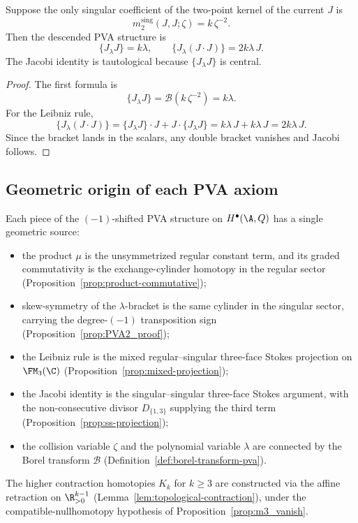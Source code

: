 \begin{proposition}
\label{prop:abelian-study}
Suppose the only singular coefficient of the two-point kernel of the current $J$ is
\[
m_2^{\mathrm{sing}}(J,J;\zeta)=k\,\zeta^{-2}.
\]
Then the descended PVA structure is
\[
\{J_\lambda J\}=k\lambda,
\qquad
\{J_\lambda (J\cdot J)\}=2k\lambda\,J.
\]
The Jacobi identity is tautological because $\{J_\lambda J\}$ is central.
\end{proposition}

\begin{proof}
The first formula is
\[
\{J_\lambda J\}
=
\mathcal B(k\,\zeta^{-2})
=
k\lambda.
\]
For the Leibniz rule,
\[
\{J_\lambda(J\cdot J)\}
=
\{J_\lambda J\}\cdot J + J\cdot\{J_\lambda J\}
=
k\lambda\,J + k\lambda\,J
=
2k\lambda\,J.
\]
Since the bracket lands in the scalars, any double bracket vanishes and Jacobi follows.
\end{proof}

\subsection{Geometric origin of each PVA axiom}

\begin{summary}
\label{sum:pva-foundational-repair}
Each piece of the $(-1)$-shifted PVA structure on $H^\bullet(\A,Q)$
has a single geometric source:
\begin{itemize}
\item the product $\mu$ is the unsymmetrized regular constant term, and
 its graded commutativity is the exchange-cylinder homotopy in the
 regular sector (Proposition~\ref{prop:product-commutative});
\item skew-symmetry of the $\lambda$-bracket is the same cylinder in the
 singular sector, carrying the degree-$(-1)$ transposition sign
 (Proposition~\ref{prop:PVA2_proof});
\item the Leibniz rule is the mixed regular--singular three-face Stokes
 projection on $\FM_3(\C)$ (Proposition~\ref{prop:mixed-projection});
\item the Jacobi identity is the singular--singular three-face Stokes
 argument, with the non-consecutive divisor $D_{\{1,3\}}$ supplying the
 third term (Proposition~\ref{prop:ss-projection});
\item the collision variable $\zeta$ and the polynomial variable
 $\lambda$ are connected by the Borel transform $\mathcal B$
 (Definition~\ref{def:borel-transform-pva}).
\end{itemize}
The higher contraction homotopies $K_k$ for $k\ge3$ are constructed via
the affine retraction on $\R^{k-1}_{>0}$
(Lemma~\ref{lem:topological-contraction}), under the
compatible-nullhomotopy hypothesis of
Proposition~\ref{prop:m3_vanish}.
\end{summary}
